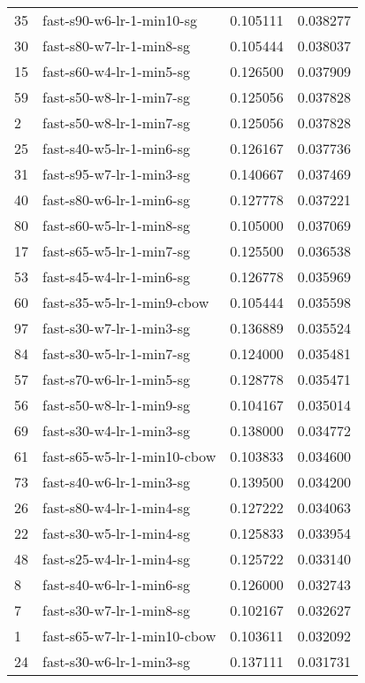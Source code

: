 {\begin{tabular}{llrr}
35 &    fast-s90-w6-lr-1-min10-sg &  0.105111 &  0.038277 \\
30 &     fast-s80-w7-lr-1-min8-sg &  0.105444 &  0.038037 \\
15 &     fast-s60-w4-lr-1-min5-sg &  0.126500 &  0.037909 \\
59 &     fast-s50-w8-lr-1-min7-sg &  0.125056 &  0.037828 \\
2  &     fast-s50-w8-lr-1-min7-sg &  0.125056 &  0.037828 \\
25 &     fast-s40-w5-lr-1-min6-sg &  0.126167 &  0.037736 \\
31 &     fast-s95-w7-lr-1-min3-sg &  0.140667 &  0.037469 \\
40 &     fast-s80-w6-lr-1-min6-sg &  0.127778 &  0.037221 \\
80 &     fast-s60-w5-lr-1-min8-sg &  0.105000 &  0.037069 \\
17 &     fast-s65-w5-lr-1-min7-sg &  0.125500 &  0.036538 \\
53 &     fast-s45-w4-lr-1-min6-sg &  0.126778 &  0.035969 \\
60 &   fast-s35-w5-lr-1-min9-cbow &  0.105444 &  0.035598 \\
97 &     fast-s30-w7-lr-1-min3-sg &  0.136889 &  0.035524 \\
84 &     fast-s30-w5-lr-1-min7-sg &  0.124000 &  0.035481 \\
57 &     fast-s70-w6-lr-1-min5-sg &  0.128778 &  0.035471 \\
56 &     fast-s50-w8-lr-1-min9-sg &  0.104167 &  0.035014 \\
69 &     fast-s30-w4-lr-1-min3-sg &  0.138000 &  0.034772 \\
61 &  fast-s65-w5-lr-1-min10-cbow &  0.103833 &  0.034600 \\
73 &     fast-s40-w6-lr-1-min3-sg &  0.139500 &  0.034200 \\
26 &     fast-s80-w4-lr-1-min4-sg &  0.127222 &  0.034063 \\
22 &     fast-s30-w5-lr-1-min4-sg &  0.125833 &  0.033954 \\
48 &     fast-s25-w4-lr-1-min4-sg &  0.125722 &  0.033140 \\
8  &     fast-s40-w6-lr-1-min6-sg &  0.126000 &  0.032743 \\
7  &     fast-s30-w7-lr-1-min8-sg &  0.102167 &  0.032627 \\
1  &  fast-s65-w7-lr-1-min10-cbow &  0.103611 &  0.032092 \\
24 &     fast-s30-w6-lr-1-min3-sg &  0.137111 &  0.031731 \\

\end{tabular}}
